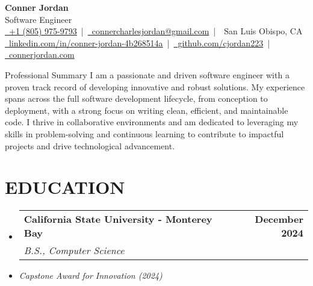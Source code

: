 \documentclass[letterpaper,10pt]{article}
\makeatletter
\newcommand{\resumeSubHeadingListStart}{\begin{itemize}[leftmargin=0in,label={}]}
\newcommand{\resumeSubHeadingListEnd}{\end{itemize}}
\newcommand{\resumeSubheading}[4]{%
  \vspace{-2pt}\item
  \begin{tabular*}{\textwidth}[t]{l@{\extracolsep{\fill}}r}
    \textbf{\large #1} & \textbf{\small #2} \\
    \textit{\large #3} & \textit{\small #4} \\
  \end{tabular*}\vspace{-2pt}
}
\makeatother
\begin{document}
\begin{center}
  {\Huge \textbf{Conner Jordan}}\\[0pt]  %
  {\Large Software Engineer}\\[0pt]  %
  \href{tel:+18059759793}{\faPhone\ +1 (805) 975-9793} \,|\, 
  \href{mailto:connercharlesjordan@gmail.com}{\faEnvelope\ connercharlesjordan@gmail.com} \,|\, 
  \faMapMarker\ San Luis Obispo, CA \\[-2pt]  %
  \href{https://www.linkedin.com/in/conner-jordan-4b268514a/}{\faLinkedin\ linkedin.com/in/conner-jordan-4b268514a}
  \,|\, \href{https://github.com/cjordan223}{\faGithub\ github.com/cjordan223}
  \,|\, \href{https://connerjordan.com/}{\faGlobe\ connerjordan.com}
\end{center}

\vspace{4pt}  %

\begin{cvsection}{Professional Summary}
I am a passionate and driven software engineer with a proven track record of developing innovative and robust solutions. My experience spans across the full software development lifecycle, from conception to deployment, with a strong focus on writing clean, efficient, and maintainable code. I thrive in collaborative environments and am dedicated to leveraging my skills in problem-solving and continuous learning to contribute to impactful projects and drive technological advancement.
\end{cvsection}
\vspace{6pt}  %

\section{EDUCATION}
\vspace{8pt}  %
\resumeSubHeadingListStart
  \resumeSubheading
    {California State University - Monterey Bay}{December 2024}
    {B.S., Computer Science}{}
  \item \small{\textit{Capstone Award for Innovation (2024)}}
\resumeSubHeadingListEnd
\vspace{6pt}  %
\end{document}
